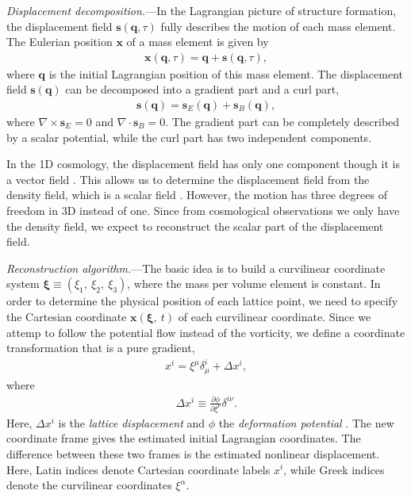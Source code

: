 \documentclass[aps,prd,twocolumn,superscriptaddress,groupedaddress,nofootinbib]{revtex4}  %
\newcommand{\bea}{\begin{eqnarray}}
\newcommand{\eea}{\end{eqnarray}}
\begin{document}
{\it Displacement decomposition.}---In the Lagrangian picture of structure 
formation, 
the displacement field $\bm{s}(\bm{q},\tau)$ fully describes the motion of each mass element. The Eulerian position $\bm{x}$ of a mass element is given by
\bea
\bm{x}(\bm{q},\tau)=\bm{q}+\bm{s}(\bm{q},\tau),
\eea
where $\bm{q}$ is the initial Lagrangian position of this mass element.
The displacement field $\bm{s}(\bm{q})$ can be decomposed into a gradient part
and a curl part,
\bea
\bm{s}(\bm{q})=\bm{s}_E(\bm{q})+\bm{s}_B(\bm{q}),
\eea
where $\nabla\times\bm{s}_E=0$ and $\nabla\cdot\bm{s}_B=0$.
The gradient part can be completely described by a scalar potential,
while the curl part has two independent components.

In the 1D cosmology, the displacement field has only one component though 
it is a vector field \cite{2016matt}. 
This allows us to determine the displacement field 
from the density field, which is a scalar field \cite{2016arXiv160907041Z}.
However, the motion has three degrees of freedom in 3D instead of one.
Since from cosmological observations we only have the density field, we expect 
to reconstruct the scalar part of the displacement field.


{\it Reconstruction algorithm.}---The basic idea is to build a curvilinear 
coordinate system $\bm{\xi}\equiv(\xi_1,\ \xi_2,\ \xi_3)$, where the mass per
volume element is constant. 
In order to determine the physical position of each lattice point, we need to 
specify the Cartesian coordinate $\bm{x}(\bm{\xi},\ t)$ of each curvilinear 
coordinate.
Since we attemp to follow the potential flow instead of the vorticity, we 
define a coordinate transformation that is a pure gradient,
\bea
\label{eq:trs}
x^i=\xi^\mu\delta^i_\mu+\Delta x^i,
\eea
where
\bea
\Delta x^i\equiv\frac{\partial\phi}{\partial\xi^\nu}\delta^{i\nu}.
\eea
Here, $\Delta{x}^i$ is the {\it lattice displacement} and $\phi$ the 
{\it deformation potential} \cite{1995ApJS..100..269P,1998ApJS..115...19P}. 
The new coordinate frame gives the estimated initial Lagrangian coordinates. 
The difference between these two frames is the estimated nonlinear displacement.
Here, Latin indices denote Cartesian coordinate labels $x^i$, while Greek 
indices denote the curvilinear coordinates $\xi^\alpha$.
\end{document}
